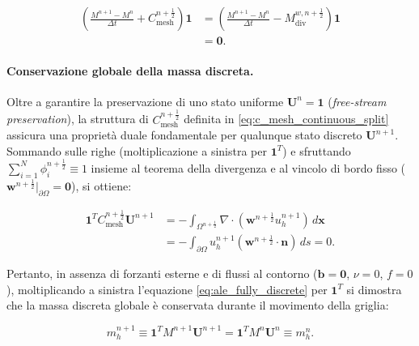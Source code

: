 \begin{equation}
\begin{aligned}
\left(
\frac{M^{n+1}-M^n}{\Delta t}
+
C_{\mathrm{mesh}}^{n+\frac12}
\right)\mathbf{1}
&=
\left(
\frac{M^{n+1}-M^n}{\Delta t}
-
M_{\mathrm{div}}^{w,n+\frac12}
\right)\mathbf{1}
\\
&=
\mathbf{0}.
\end{aligned}
\label{eq:algebraic_dgcl}
\end{equation}

\paragraph{Conservazione globale della massa discreta.}

Oltre a garantire la preservazione di uno stato uniforme $\mathbf{U}^n = \mathbf{1}$ (\textit{free-stream preservation}), la struttura di $C_{\mathrm{mesh}}^{n+\frac12}$ definita in \eqref{eq:c_mesh_continuous_split} assicura una proprietà duale fondamentale per qualunque stato discreto $\mathbf{U}^{n+1}$. Sommando sulle righe (moltiplicazione a sinistra per $\mathbf{1}^T$) e sfruttando $\sum_{i=1}^N \phi_i^{n+\frac12} \equiv 1$ insieme al teorema della divergenza e al vincolo di bordo fisso ($\mathbf{w}^{n+\frac12}|_{\partial\Omega} = \mathbf{0}$), si ottiene:

\begin{equation}
\begin{aligned}
\mathbf{1}^T C_{\mathrm{mesh}}^{n+\frac12}\mathbf{U}^{n+1}
&=
-\int_{\Omega^{n+\frac12}}
\nabla\cdot\left(\mathbf{w}^{n+\frac12} u_h^{n+1}\right)
\,d\mathbf{x}
\\
&=
-\int_{\partial\Omega}
u_h^{n+1}\left(\mathbf{w}^{n+\frac12}\cdot\mathbf{n}\right)
\,ds
=
0.
\end{aligned}
\label{eq:dual_mass_conservation_identity}
\end{equation}

Pertanto, in assenza di forzanti esterne e di flussi al contorno ($\mathbf{b}=\mathbf{0}$, $\nu=0$, $f=0$), moltiplicando a sinistra l'equazione \eqref{eq:ale_fully_discrete} per $\mathbf{1}^T$ si dimostra che la massa discreta globale è conservata durante il movimento della griglia:

\begin{equation}
m_h^{n+1}
\equiv
\mathbf{1}^T M^{n+1}\mathbf{U}^{n+1}
=
\mathbf{1}^T M^n\mathbf{U}^n
\equiv
m_h^n.
\label{eq:discrete_mass_invariance}
\end{equation}

